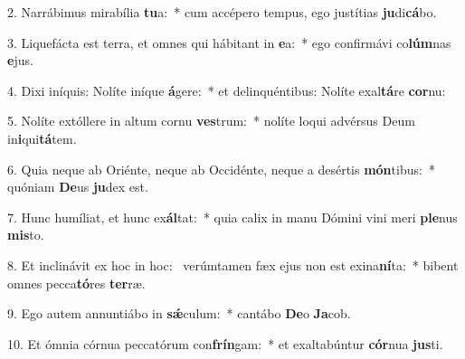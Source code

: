 2. Narrábimus mirabília \textbf{tu}a:~*  cum accépero tempus, ego justítias \textbf{ju}di\textbf{cá}bo.\

3. Liquefácta est terra, et omnes qui hábitant in \textbf{e}a:~*  ego confirmávi co\textbf{lúm}nas \textbf{e}jus.\

4. Dixi iníquis: Nolíte iníque \textbf{á}gere:~*  et delinquéntibus: Nolíte exal\textbf{tá}re \textbf{cor}nu:\

5. Nolíte extóllere in altum cornu \textbf{ves}trum:~*  nolíte loqui advérsus Deum in\textbf{i}qui\textbf{tá}tem.\

6. Quia neque ab Oriénte, neque ab Occidénte, neque a desértis \textbf{món}tibus:~*  quóniam \textbf{De}us \textbf{ju}dex est.\

7. Hunc humíliat, et hunc ex\textbf{ál}tat:~*  quia calix in manu Dómini vini meri \textbf{ple}nus \textbf{mis}to.\

8. Et inclinávit ex hoc in hoc: \dag\  verúmtamen fæx ejus non est exina\textbf{ní}ta:~*  bibent omnes pecca\textbf{tó}res \textbf{ter}ræ.\

9. Ego autem annuntiábo in \textbf{sǽ}culum:~*  cantábo \textbf{De}o \textbf{Ja}cob.\

10. Et ómnia córnua peccatórum con\textbf{frín}gam:~*  et exaltabúntur \textbf{cór}nua \textbf{jus}ti.\

